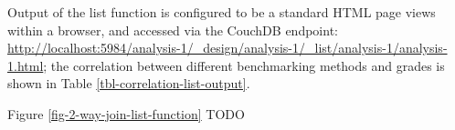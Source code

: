Output of the list function is configured to be a standard HTML page views within a browser, and accessed via the CouchDB endpoint: \url{http://localhost:5984/analysis-1/_design/analysis-1/_list/analysis-1/analysis-1.html}; the correlation between different benchmarking methods and grades is shown in Table \ref{tbl-correlation-list-output}.



Figure \ref{fig-2-way-join-list-function}  TODO



